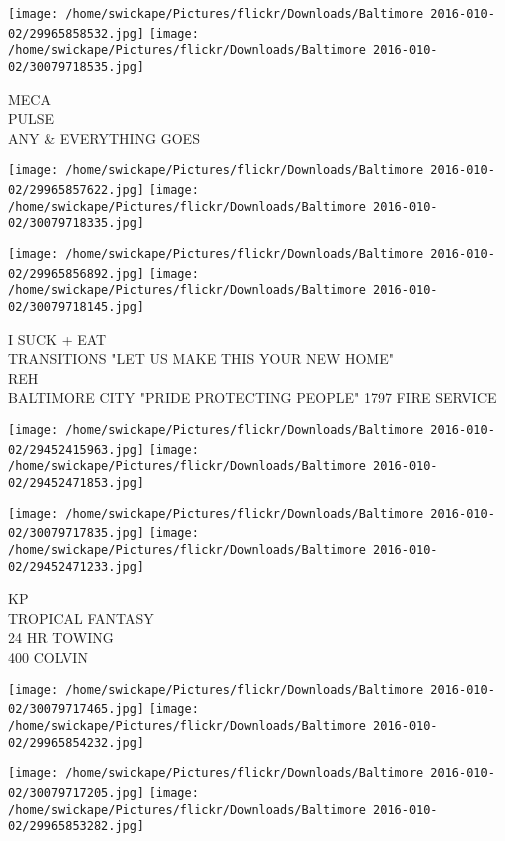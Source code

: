 \documentclass[10pt,letterpaper]{article}
\begin{document}
\vspace{0.25in}
\texttt{[image: /home/swickape/Pictures/flickr/Downloads/Baltimore 2016-010-02/29965858532.jpg]}
\texttt{[image: /home/swickape/Pictures/flickr/Downloads/Baltimore 2016-010-02/30079718535.jpg]}

MECA\\
PULSE\\
ANY \& EVERYTHING GOES
\pagebreak

\texttt{[image: /home/swickape/Pictures/flickr/Downloads/Baltimore 2016-010-02/29965857622.jpg]}
\texttt{[image: /home/swickape/Pictures/flickr/Downloads/Baltimore 2016-010-02/30079718335.jpg]}

\texttt{[image: /home/swickape/Pictures/flickr/Downloads/Baltimore 2016-010-02/29965856892.jpg]}
\texttt{[image: /home/swickape/Pictures/flickr/Downloads/Baltimore 2016-010-02/30079718145.jpg]}

I SUCK + EAT\\
TRANSITIONS "LET US MAKE THIS YOUR NEW HOME"\\
REH\\
BALTIMORE CITY "PRIDE PROTECTING PEOPLE" 1797 FIRE SERVICE
\pagebreak

\texttt{[image: /home/swickape/Pictures/flickr/Downloads/Baltimore 2016-010-02/29452415963.jpg]}
\texttt{[image: /home/swickape/Pictures/flickr/Downloads/Baltimore 2016-010-02/29452471853.jpg]}

\texttt{[image: /home/swickape/Pictures/flickr/Downloads/Baltimore 2016-010-02/30079717835.jpg]}
\texttt{[image: /home/swickape/Pictures/flickr/Downloads/Baltimore 2016-010-02/29452471233.jpg]}

KP\\
TROPICAL FANTASY\\
24 HR TOWING\\
400 COLVIN
\pagebreak

\texttt{[image: /home/swickape/Pictures/flickr/Downloads/Baltimore 2016-010-02/30079717465.jpg]}
\texttt{[image: /home/swickape/Pictures/flickr/Downloads/Baltimore 2016-010-02/29965854232.jpg]}

\texttt{[image: /home/swickape/Pictures/flickr/Downloads/Baltimore 2016-010-02/30079717205.jpg]}
\texttt{[image: /home/swickape/Pictures/flickr/Downloads/Baltimore 2016-010-02/29965853282.jpg]}
\end{document}
